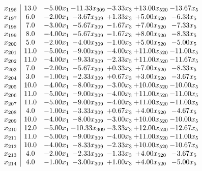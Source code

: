 \documentclass[8pt]{article}
\begin{document}
\[\begin{array}{c| c c@{\hskip 2pt} c@{\hskip 2pt} c@{\hskip 2pt} c@{\hskip 2pt} c@{\hskip 2pt} }
 x_{196}   &  13.0 & -5.00 x_{1} & -11.33 x_{309} & -3.33 x_{3} & + 13.00 x_{520} & -13.67 x_{5}\\
 x_{197}   &  6.0 & -2.00 x_{1} & -3.67 x_{309} & +  1.33 x_{3} & +  5.00 x_{520} & -6.33 x_{5}\\
 x_{198}   &  7.0 & -3.00 x_{1} & -5.67 x_{309} & -1.67 x_{3} & +  7.00 x_{520} & -7.33 x_{5}\\
 x_{199}   &  8.0 & -4.00 x_{1} & -5.67 x_{309} & -1.67 x_{3} & +  8.00 x_{520} & -8.33 x_{5}\\
 x_{200}   &  5.0 & -2.00 x_{1} & -4.00 x_{309} & -1.00 x_{3} & +  5.00 x_{520} & -5.00 x_{5}\\
 x_{201}   &  11.0 & -5.00 x_{1} & -9.00 x_{309} & -4.00 x_{3} & + 11.00 x_{520} & -11.00 x_{5}\\
 x_{202}   &  11.0 & -4.00 x_{1} & -9.33 x_{309} & -2.33 x_{3} & + 11.00 x_{520} & -11.67 x_{5}\\
 x_{203}   &  7.0 & -2.00 x_{1} & -5.67 x_{309} & +  0.33 x_{3} & +  7.00 x_{520} & -8.33 x_{5}\\
 x_{204}   &  3.0 & -1.00 x_{1} & -2.33 x_{309} & +  0.67 x_{3} & +  3.00 x_{520} & -3.67 x_{5}\\
 x_{205}   &  10.0 & -4.00 x_{1} & -8.00 x_{309} & -3.00 x_{3} & + 10.00 x_{520} & -10.00 x_{5}\\
 x_{206}   &  11.0 & -5.00 x_{1} & -9.00 x_{309} & -4.00 x_{3} & + 11.00 x_{520} & -11.00 x_{5}\\
 x_{207}   &  11.0 & -5.00 x_{1} & -9.00 x_{309} & -4.00 x_{3} & + 11.00 x_{520} & -11.00 x_{5}\\
 x_{208}   &  4.0 & -1.00 x_{1} & -3.33 x_{309} & +  0.67 x_{3} & +  4.00 x_{520} & -4.67 x_{5}\\
 x_{209}   &  10.0 & -4.00 x_{1} & -8.00 x_{309} & -3.00 x_{3} & + 10.00 x_{520} & -10.00 x_{5}\\
 x_{210}   &  12.0 & -5.00 x_{1} & -10.33 x_{309} & -3.33 x_{3} & + 12.00 x_{520} & -12.67 x_{5}\\
 x_{211}   &  11.0 & -5.00 x_{1} & -9.00 x_{309} & -4.00 x_{3} & + 11.00 x_{520} & -11.00 x_{5}\\
 x_{212}   &  10.0 & -4.00 x_{1} & -8.33 x_{309} & -2.33 x_{3} & + 10.00 x_{520} & -10.67 x_{5}\\
 x_{213}   &  4.0 & -2.00 x_{1} & -2.33 x_{309} & -1.33 x_{3} & +  4.00 x_{520} & -3.67 x_{5}\\
 x_{214}   &  4.0 & -1.00 x_{1} & -3.00 x_{309} & +  1.00 x_{3} & +  4.00 x_{520} & -5.00 x_{5}\\

\end{array}\]
\end{document}
